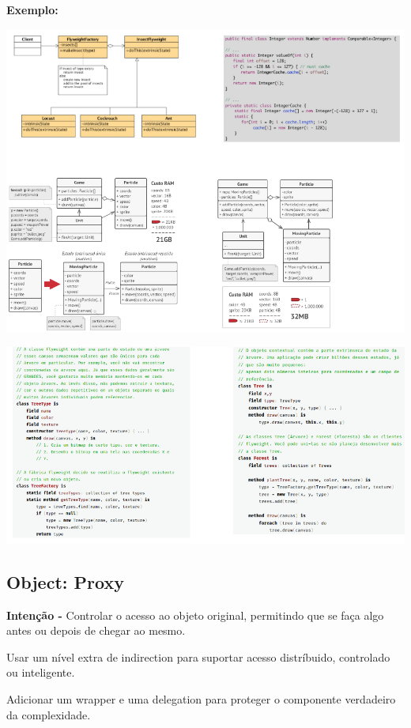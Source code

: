 \documentclass{article}
\begin{document}
\begin{flushleft}
    \textbf{Exemplo:}

    \begin{center}
        \includegraphics[scale=0.5]{Images/53.png}
    \end{center}

    \vspace{1.5mm}
    \begin{center}
        \includegraphics[scale=0.45]{Images/54.png}
    \end{center}
\end{flushleft}

\pagebreak

\subsection{Object: Proxy}

\begin{flushleft}
    \textbf{Intenção -} Controlar o acesso ao objeto original, permitindo que se faça algo antes ou depois de
    chegar ao mesmo.

    Usar um nível extra de indirection para suportar acesso distríbuido, controlado ou inteligente.

    Adicionar um wrapper e uma delegation para proteger o componente verdadeiro da complexidade.
\end{flushleft}
\end{document}
